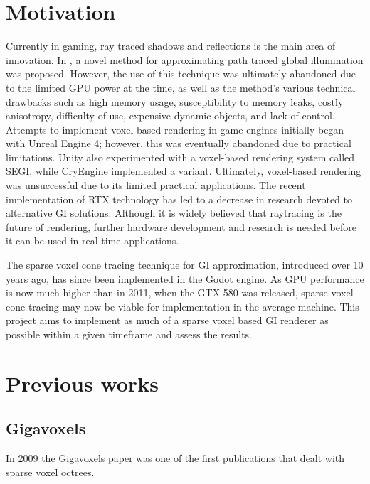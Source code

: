 
\section{Motivation}
Currently in gaming, ray traced shadows and reflections is the main area of innovation. In \cite{10.1145/2037826.2037853}, a novel method for approximating path traced global illumination was proposed. However, the use of this technique was ultimately abandoned due to the limited GPU power at the time, as well as the method's various technical drawbacks such as high memory usage, susceptibility to memory leaks, costly anisotropy, difficulty of use, expensive dynamic objects, and lack of control. Attempts to implement voxel-based rendering in game engines initially began with Unreal Engine 4; however, this was eventually abandoned due to practical limitations. Unity also experimented with a voxel-based rendering system called SEGI, while CryEngine implemented a variant. Ultimately, voxel-based rendering was unsuccessful due to its limited practical applications. The recent implementation of RTX technology has led to a decrease in research devoted to alternative GI solutions. Although it is widely believed that raytracing is the future of rendering, further hardware development and research is needed before it can be used in real-time applications. 

The sparse voxel cone tracing technique for GI approximation, introduced over 10 years ago, has since been implemented in the Godot engine. As GPU performance is now much higher than in 2011, when the GTX 580 was released, sparse voxel cone tracing may now be viable for implementation in the average machine. This project aims to implement as much of a sparse voxel based GI renderer as possible within a given timeframe and assess the results.
\section{Previous works}
\subsection{Gigavoxels}
In 2009 the Gigavoxels paper was one of the first publications that dealt with sparse voxel octrees.

